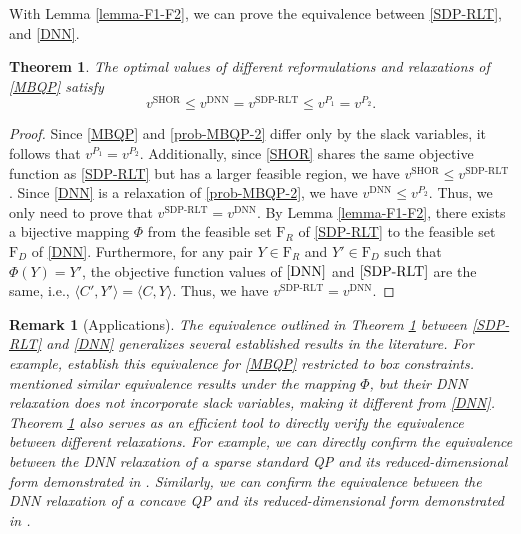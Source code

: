 \documentclass[11pt]{article}
\theoremstyle{plain}
\newtheorem{remark}{Remark}
\newtheorem{theorem}{Theorem}
\def\<{\big\langle}
\def\>{\big\rangle}
\begin{document}
With Lemma \ref{lemma-F1-F2}, we can prove the equivalence between \eqref{SDP-RLT}, and \eqref{DNN}.
%
\begin{theorem}\label{thm-1} The optimal values of different reformulations and relaxations of \eqref{MBQP} satisfy
    \begin{equation*}
    v^{\text{SHOR}} \leq 
    v^{\text{DNN}} =
    v^{\text{SDP-RLT}} \leq 
    v^{P_1} =
    v^{P_2}.
    \end{equation*}
\end{theorem} 
%
\begin{proof}
Since \eqref{MBQP} and \eqref{prob-MBQP-2} differ only by the slack variables, it follows that $v^{P_1}=v^{P_2}$. Additionally, since \eqref{SHOR} shares the same objective function as \eqref{SDP-RLT} but has a larger feasible region, we have $v^{\text{SHOR}}\leq v^{\text{SDP-RLT}}$. Since \eqref{DNN} is a relaxation of \eqref{prob-MBQP-2}, we have $v^{\text{DNN}}\leq v^{P_2}$. Thus, we only need to prove that $v^{\text{SDP-RLT}} = v^{\text{DNN}}$. By Lemma \ref{lemma-F1-F2}, there exists a bijective mapping $\Phi$ from the feasible set ${\mathrm{F}_R}$ of \eqref{SDP-RLT} to the feasible set ${\mathrm{F}_D}$ of \eqref{DNN}. Furthermore, for any pair $Y\in{\mathrm{F}_R}$ and $Y'\in{\mathrm{F}_D}$ such that $\Phi(Y)=Y'$, the objective function values of $\eqref{DNN}$ and $\eqref{SDP-RLT}$ are the same, i.e., $\<C',Y'\>=\<C,Y\>$. Thus, we have $v^{\text{SDP-RLT}} =v^{\text{DNN}}$.
\end{proof}
\begin{remark}[Applications]
The equivalence outlined in Theorem \ref{thm-1} between \eqref{SDP-RLT} and \eqref{DNN} generalizes several established results in the literature. For example, \cite{bao2011semidefinite,sherali2013reformulation} establish this equivalence for \eqref{MBQP} restricted to box constraints. \cite{anstreicher2012convex,bomze2019notoriously} mentioned similar equivalence results under the mapping $\Phi$, but their DNN relaxation does not incorporate slack variables, making it different from \eqref{DNN}. Theorem \ref{thm-1} also serves as an efficient tool to directly verify the equivalence between different relaxations. For example, we can directly confirm the equivalence between the DNN relaxation of a sparse standard QP and its reduced-dimensional form demonstrated in \cite[Section 3]{bomze2024tighter}. Similarly, we can confirm the equivalence between the DNN relaxation of a concave QP and its reduced-dimensional form demonstrated in \cite[subsection 2.2]{qu2023globally}.
\end{remark}
\end{document}
